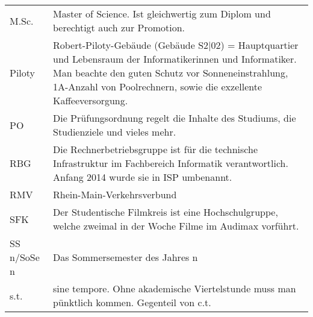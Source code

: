 \begin{longtable}{p{20mm}p{85mm}}
    M.Sc.        & Master of Science. Ist gleichwertig zum Diplom und berechtigt auch zur Promotion.                                                                                                                                                                                       \\
    Piloty       & Robert-Piloty-Gebäude (Gebäude S2$|$02) = Hauptquartier und Lebensraum der Informatikerinnen und Informatiker. Man beachte den guten Schutz vor Sonneneinstrahlung, 1A-Anzahl von Poolrechnern, sowie die exzellente Kaffeeversorgung.                                  \\
    PO           & Die Prüfungsordnung regelt die Inhalte des Studiums, die Studienziele und vieles mehr.                                                                                                                                                                                  \\
    RBG          & Die Rechnerbetriebsgruppe ist für die technische Infrastruktur im Fachbereich Informatik verantwortlich. Anfang 2014 wurde sie in ISP umbenannt.                                                                                                                        \\
    RMV          & Rhein-Main-Verkehrsverbund                                                                                                                                                                                                                                              \\
    SFK          & Der Studentische Filmkreis ist eine Hochschulgruppe, welche zweimal in der Woche Filme im Audimax vorführt.                                                                                                                                                             \\
    SS n/SoSe n  & Das Sommersemester des Jahres n                                                                                                                                                                                                                                         \\
    s.t.         & sine tempore. Ohne akademische Viertelstunde muss man pünktlich kommen. Gegenteil von c.t.                                                                                                                                                                              \\

\end{longtable}
